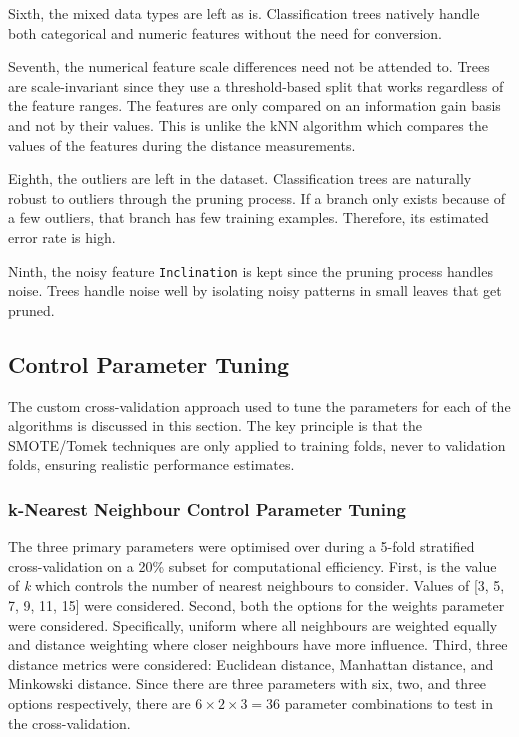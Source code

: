\documentclass[10pt, conference]{IEEEtran}
\begin{document}
Sixth, the mixed data types are left as is. Classification trees natively handle both categorical and numeric features without the need for conversion.

Seventh, the numerical feature scale differences need not be attended to. Trees are scale-invariant since they use a threshold-based split that works regardless of the feature ranges. The features are only compared on an information gain basis and not by their values. This is unlike the kNN algorithm which compares the values of the features during the distance measurements.

Eighth, the outliers are left in the dataset. Classification trees are naturally robust to outliers through the pruning process. If a branch only exists because of a few outliers, that branch has few training examples. Therefore, its estimated error rate is high.

Ninth, the noisy feature \texttt{Inclination} is kept since the pruning process handles noise. Trees handle noise well by isolating noisy patterns in small leaves that get pruned.


\subsection{Control Parameter Tuning}
The custom cross-validation approach used to tune the parameters for each of the algorithms is discussed in this section. The key principle is that the SMOTE/Tomek techniques are only applied to training folds, never to validation folds, ensuring realistic performance estimates.
\subsubsection{k-Nearest Neighbour Control Parameter Tuning}
The three primary parameters were optimised over during a 5-fold stratified cross-validation on a 20\% subset for computational efficiency. First, is the value of \textit{k} which controls the number of nearest neighbours to consider. Values of [3, 5, 7, 9, 11, 15] were considered. Second, both the options for the weights parameter were considered. Specifically, uniform where all neighbours are weighted equally and distance weighting where closer neighbours have more influence. Third, three distance metrics were considered: Euclidean distance, Manhattan distance, and Minkowski distance. Since there are three parameters with six, two, and three options respectively, there are $6 \times 2 \times 3 = 36$ parameter combinations to test in the cross-validation. 
	
\end{document}
